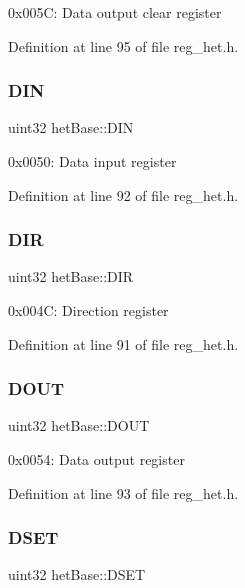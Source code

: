 0x005C\+: Data output clear register 

Definition at line 95 of file reg\+\_\+het.\+h.

\mbox{\label{structhetBase_a286fb882a2ad3d29bf53f0895fb0d8c6}} 
\subsubsection{\texorpdfstring{D\+IN}{DIN}}
{\footnotesize\ttfamily uint32 het\+Base\+::\+D\+IN}

0x0050\+: Data input register 

Definition at line 92 of file reg\+\_\+het.\+h.

\mbox{\label{structhetBase_aaf66f3137c03f23a784194888d2cfca5}} 
\subsubsection{\texorpdfstring{D\+IR}{DIR}}
{\footnotesize\ttfamily uint32 het\+Base\+::\+D\+IR}

0x004C\+: Direction register 

Definition at line 91 of file reg\+\_\+het.\+h.

\mbox{\label{structhetBase_ae57f71a97177d4850d0d91a7f07e7f0b}} 
\subsubsection{\texorpdfstring{D\+O\+UT}{DOUT}}
{\footnotesize\ttfamily uint32 het\+Base\+::\+D\+O\+UT}

0x0054\+: Data output register 

Definition at line 93 of file reg\+\_\+het.\+h.

\mbox{\label{structhetBase_ab39dc154694a328d7a9019c081fed360}} 
\subsubsection{\texorpdfstring{D\+S\+ET}{DSET}}
{\footnotesize\ttfamily uint32 het\+Base\+::\+D\+S\+ET}

